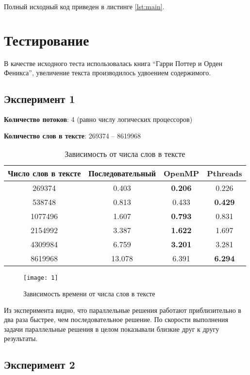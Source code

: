 Полный исходный код приведен в листинге \vref{lst:main}.

\section{Тестирование}

В качестве исходного теста использовалась книга "`Гарри Поттер и Орден Феникса"', увеличение текста производилось удвоением содержимого.

\subsection{Эксперимент 1}

\textbf{Количество потоков}: 4 (равно числу логических процессоров)

\textbf{Количество слов в тексте}: 269374 -- 8619968

\begin{table}[H]
	\centering
	\begin{tabular}{|c|c|c|c|}
		\hline
		Число слов в тексте        & Последовательный & OpenMP & Pthreads \\ \hline
		269374  & 0.403            & \textbf{0.206} & 0.226 \\ \hline
		538748  & 0.813            & 0.433 & \textbf{0.429} \\ \hline
		1077496 & 1.607            & \textbf{0.793} & 0.831 \\ \hline
		2154992 & 3.387            & \textbf{1.622} & 1.697 \\ \hline
		4309984 & 6.759            & \textbf{3.201} & 3.281 \\ \hline
		8619968 & 13.078           & 6.391 & \textbf{6.294} \\
		\hline
	\end{tabular}
	\caption{Зависимость от числа слов в тексте}
	\label{tab:wordchange}
\end{table}

\begin{figure}[H]
	\centering
	\texttt{[image: 1]}
	\caption{Зависимость времени от числа слов в тексте}
	\label{pic:wordchange}
\end{figure}

Из эксперимента видно, что параллельные решения работают приблизительно в два раза быстрее, чем последовательное решение. По скорости выполнения задачи параллельные решения в целом показывали близкие друг к другу результаты.

\subsection{Эксперимент 2}

